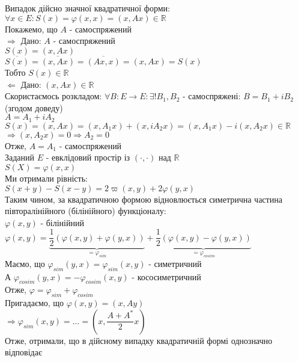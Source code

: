 \documentclass[a4paper, 10pt]{article}
\theoremstyle{theoremdd}
\theoremstyle{theoremdd}
\theoremstyle{theoremdd}
\theoremstyle{theoremdd}
\theoremstyle{theoremdd}
\theoremstyle{theoremdd}
\theoremstyle{theoremdd}
\theoremstyle{theoremdd}
\begin{document}
Випадок дійсно значної квадратичної форми:\\
$\forall x \in E: S(x) = \varphi(x,x) = (x,Ax) \in \mathbb{R}$\\
Покажемо, що $A$ - самоспряжений\\
$\boxed{\Rightarrow}$ Дано: $A$ - самоспряжений\\
$S(x) = (x,Ax)$\\
$\overline{S(x)} = \overline{(x,Ax)} = \overline{(Ax,x)} = (x,Ax) = S(x)$\\
Тобто $S(x) \in \mathbb{R}$
\bigskip \\
$\boxed{\Leftarrow}$ Дано: $(x,Ax) \in \mathbb{R}$\\
Скористаємось розкладом: $\forall B: E \to E: \exists ! B_1,B_2$ - самоспряжені: $B = B_1 + i B_2$ (згодом доведу)\\
$A = A_1 + i A_2$\\
$S(x) = (x,Ax)= (x,A_1x) + (x,iA_2x) = (x,A_1x) - i(x,A_2x) \in \mathbb{R}$\\
$\Rightarrow (x,A_2x) = 0 \Rightarrow A_2 = 0$\\
Отже, $A = A_1$ - самоспряжений
\bigskip \\
Заданий $E$ - евклідовий простір із $(\cdot, \cdot)$ над $\mathbb{R}$\\
$S(X) = \varphi(x,x)$\\
Ми отримали рівність:\\
$S(x+y)-S(x-y) = 2\varpi(x,y) + 2\varphi(y,x)$\\
Таким чином, за квадратичною формою відновлюється симетрична частина півторалінійного (білінійного) функціоналу:\\
$\varphi(x,y)$ - білінійний\\
$\varphi(x,y) =  \underbrace{\dfrac{1}{2} \left(\varphi(x,y) + \varphi(y,x) \right)}_{= \varphi_{sim}} + \underbrace{\dfrac{1}{2} \left(\varphi(x,y) - \varphi(y,x) \right)}_{= \varphi_{cosim}}$\\
Маємо, що $\varphi_{sim}(y,x) = \varphi_{sim}(x,y)$ - симетричний\\
А $\varphi_{cosim}(y,x) = -\varphi_{cosim}(x,y)$ - кососиметричний\\
Отже, $\varphi = \varphi_{sim} + \varphi_{cosim}$\\
Пригадаємо, що $\varphi(x,y) = (x,Ay)$\\
$\Rightarrow \varphi_{sim}(x,y) = \dots = \left(x, \dfrac{A+A^*}{2}x \right)$\\
Отже, отримали, що в дійсному випадку квадратичній формі однозначно відповідає\\
\end{document}
